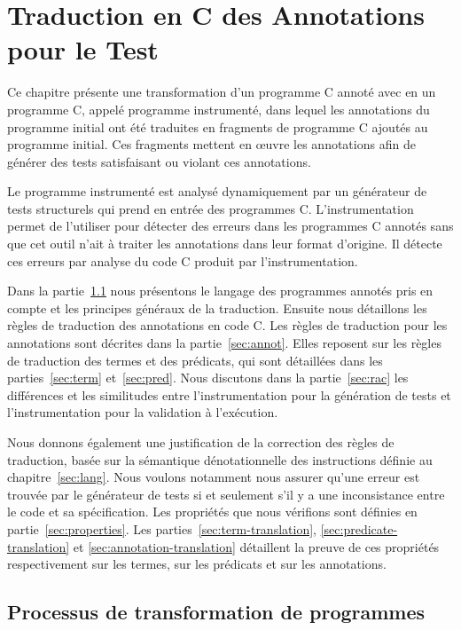 
\chapter{Traduction en C des Annotations pour le Test}
\label{sec:traduction}

\chapterintro

Ce chapitre présente une transformation d'un programme C annoté avec \eacsl en
un programme C, appelé programme instrumenté, dans lequel les annotations
\eacsl du programme initial ont été traduites en fragments de programme C
ajoutés au programme initial.
Ces fragments mettent en \oe{}uvre les annotations \eacsl afin de générer des
tests satisfaisant ou violant ces annotations.

Le programme instrumenté est analysé dynamiquement par un générateur de tests
structurels qui prend en entrée des programmes C.
L'instrumentation permet de l'utiliser pour détecter des erreurs dans les
programmes C annotés sans que cet outil n'ait à traiter les annotations dans
leur format d'origine.
Il détecte ces erreurs par analyse du code C produit par l'instrumentation.

Dans la partie~\ref{sec:process} nous présentons le langage des programmes
annotés pris en compte et les principes généraux de la traduction.
Ensuite nous détaillons les règles de traduction des annotations \eacsl en code
C.
Les règles de traduction pour les annotations sont décrites dans la
partie~\ref{sec:annot}.
Elles reposent sur les règles de traduction des termes et des prédicats, qui
sont détaillées dans les parties~\ref{sec:term} et~\ref{sec:pred}.
Nous discutons dans la partie~\ref{sec:rac} les différences et les
similitudes entre l'instrumentation pour la génération de tests et
l'instrumentation pour la validation à l'exécution.

Nous donnons également une justification de la correction des règles de
traduction, basée sur la sémantique dénotationnelle des instructions définie au
chapitre~\ref{sec:lang}.
Nous voulons notamment nous assurer qu'une erreur est trouvée par le
générateur de tests si et seulement s'il y a une inconsistance entre le code
et sa spécification.
Les propriétés que nous vérifions sont définies en partie~\ref{sec:properties}.
Les parties~\ref{sec:term-translation}, \ref{sec:predicate-translation} et
\ref{sec:annotation-translation} détaillent la preuve de ces propriétés
respectivement sur les termes, sur les prédicats et sur les annotations.


\section{Processus de transformation de programmes}
\label{sec:process}


